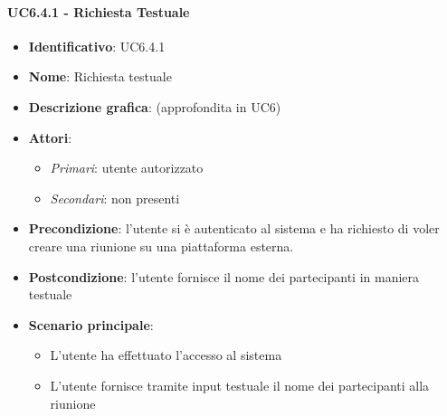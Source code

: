 \paragraph{UC6.4.1 - Richiesta Testuale}
\begin{itemize}
   \item \textbf{Identificativo}: UC6.4.1
   \item \textbf{Nome}: Richiesta testuale
   \item \textbf{Descrizione grafica}: (approfondita in UC6)
   \item \textbf{Attori}:
   \begin{itemize} 
       \item \textit{Primari}: utente autorizzato
       \item \textit{Secondari}: non presenti
   \end{itemize}
       \item \textbf{Precondizione}: l'utente si è autenticato al sistema e ha richiesto di voler creare una riunione su una piattaforma esterna.
       \item \textbf{Postcondizione}: l'utente fornisce il nome dei partecipanti in maniera testuale
    \item \textbf{Scenario principale}: 
       \begin{itemize}
           \item L'utente ha effettuato l'accesso al sistema 
           \item L'utente fornisce tramite input testuale il nome dei partecipanti alla riunione
       \end{itemize}
\end{itemize}

